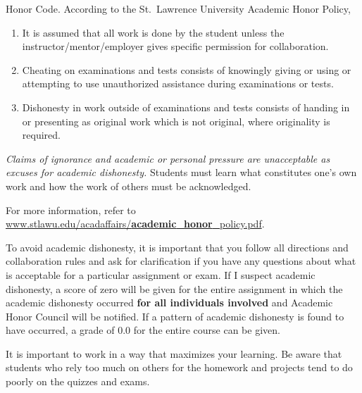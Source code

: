 \documentclass[
]{book}
\providecommand{\tightlist}{%
  \setlength{\itemsep}{0pt}\setlength{\parskip}{0pt}}
\begin{document}
Honor Code. According to the St.~Lawrence University Academic Honor Policy,

\begin{enumerate}
\def\labelenumi{\arabic{enumi}.}
\tightlist
\item
  It is assumed that all work is done by the student unless the instructor/mentor/employer gives specific permission for collaboration.
\item
  Cheating on examinations and tests consists of knowingly giving or using or attempting to use unauthorized assistance during examinations or tests.
\item
  Dishonesty in work outside of examinations and tests consists of handing in or presenting as original work which is not original, where originality is required.
\end{enumerate}

\emph{Claims of ignorance and academic or personal pressure are unacceptable as excuses for academic dishonesty.} Students must learn what constitutes one's own work and how the work of others must be acknowledged.

For more information, refer to \href{../../C:\%5CUsers\%5Ciramler\%5CAppData\%5CLocal\%5CTemp\%5Cwww.stlawu.edu\%5Cacadaffairs\%5Cacademic_honor_policy.pdf}{www.stlawu.edu/acadaffairs/}\href{../../C:\%5CUsers\%5Ciramler\%5CAppData\%5CLocal\%5CTemp\%5Cwww.stlawu.edu\%5Cacadaffairs\%5Cacademic_honor_policy.pdf}{\textbf{academic}}\href{../../C:\%5CUsers\%5Ciramler\%5CAppData\%5CLocal\%5CTemp\%5Cwww.stlawu.edu\%5Cacadaffairs\%5Cacademic_honor_policy.pdf}{\_}\href{../../C:\%5CUsers\%5Ciramler\%5CAppData\%5CLocal\%5CTemp\%5Cwww.stlawu.edu\%5Cacadaffairs\%5Cacademic_honor_policy.pdf}{\textbf{honor}}\href{../../C:\%5CUsers\%5Ciramler\%5CAppData\%5CLocal\%5CTemp\%5Cwww.stlawu.edu\%5Cacadaffairs\%5Cacademic_honor_policy.pdf}{\_policy.pdf}.

To avoid academic dishonesty, it is important that you follow all directions and collaboration rules and ask for clarification if you have any questions about what is acceptable for a particular assignment or exam. If I suspect academic dishonesty, a score of zero will be given for the entire assignment in which the academic dishonesty occurred \textbf{for all individuals involved} and Academic Honor Council will be notified. If a pattern of academic dishonesty is found to have occurred, a grade of 0.0 for the entire course can be given.

It is important to work in a way that maximizes your learning. Be aware that students who rely too much on others for the homework and projects tend to do poorly on the quizzes and exams.
\end{document}

